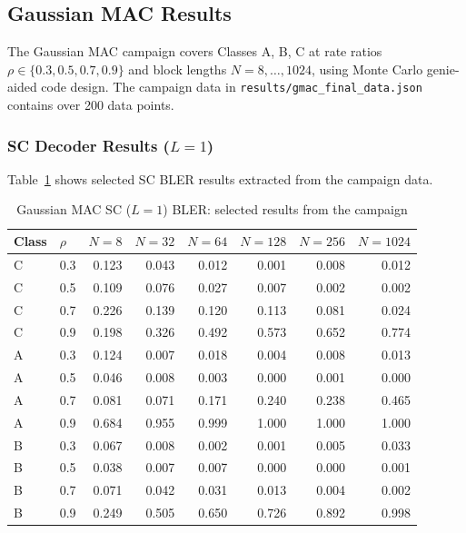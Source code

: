 \documentclass[11pt,a4paper]{article}
\begin{document}
\subsection{Gaussian MAC Results}

The Gaussian MAC campaign covers Classes A, B, C at rate ratios
$\rho \in \{0.3, 0.5, 0.7, 0.9\}$ and block lengths $N = 8, \ldots, 1024$,
using Monte Carlo genie-aided code design. The campaign data in
\texttt{results/gmac\_final\_data.json} contains over 200 data points.

\subsubsection{SC Decoder Results ($L = 1$)}

Table~\ref{tab:gmac_sc} shows selected SC BLER results extracted from the
campaign data.

\begin{table}[h]
\centering
\caption{Gaussian MAC SC ($L = 1$) BLER: selected results from the campaign}
\label{tab:gmac_sc}
\begin{tabular}{llrrrrrr}
\toprule
\textbf{Class} & $\rho$ & $N = 8$ & $N = 32$ & $N = 64$ & $N = 128$ & $N = 256$ & $N = 1024$ \\
\midrule
C & 0.3 & 0.123 & 0.043 & 0.012 & 0.001 & 0.008 & 0.012 \\
C & 0.5 & 0.109 & 0.076 & 0.027 & 0.007 & 0.002 & 0.002 \\
C & 0.7 & 0.226 & 0.139 & 0.120 & 0.113 & 0.081 & 0.024 \\
C & 0.9 & 0.198 & 0.326 & 0.492 & 0.573 & 0.652 & 0.774 \\
\midrule
A & 0.3 & 0.124 & 0.007 & 0.018 & 0.004 & 0.008 & 0.013 \\
A & 0.5 & 0.046 & 0.008 & 0.003 & 0.000 & 0.001 & 0.000 \\
A & 0.7 & 0.081 & 0.071 & 0.171 & 0.240 & 0.238 & 0.465 \\
A & 0.9 & 0.684 & 0.955 & 0.999 & 1.000 & 1.000 & 1.000 \\
\midrule
B & 0.3 & 0.067 & 0.008 & 0.002 & 0.001 & 0.005 & 0.033 \\
B & 0.5 & 0.038 & 0.007 & 0.007 & 0.000 & 0.000 & 0.001 \\
B & 0.7 & 0.071 & 0.042 & 0.031 & 0.013 & 0.004 & 0.002 \\
B & 0.9 & 0.249 & 0.505 & 0.650 & 0.726 & 0.892 & 0.998 \\
\bottomrule
\end{tabular}
\end{table}
\end{document}
